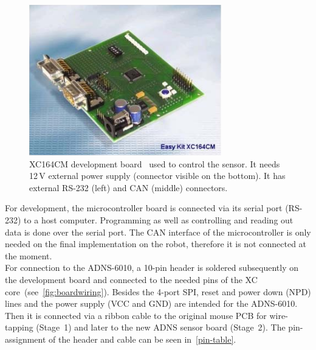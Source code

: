 \documentclass[12pt,a4paper]{article}
\begin{document}
\begin{figure}[htbp]
\begin{center}
\includegraphics[width=0.5\columnwidth]{figures/xcdevboard.png}
\caption{\label{fig:xcdevboard}
XC164CM development board~\cite{xc} used to control the sensor.
It needs 12\,V external power supply (connector visible on the bottom).
It has external RS-232 (left) and CAN (middle) connectors.
}
\end{center}
\end{figure}

For development, the microcontroller board is connected via its serial port (RS-232) to a host computer.
Programming as well as controlling and reading out data is done over the serial port.
The CAN interface of the microcontroller is only needed on the final implementation on the robot, therefore it is not connected at the moment.\\
For connection to the ADNS-6010, a 10-pin header is soldered subsequently on the development board and connected to the needed pins of the XC core~(see~\autoref{fig:boardwiring}).
Besides the 4-port SPI, reset and power down (NPD) lines and the power supply (VCC and GND) are intended for the ADNS-6010.
Then it is connected via a ribbon cable to the original mouse PCB for wire-tapping (Stage~1) and later to the new ADNS sensor board (Stage~2).
The pin-assignment of the header and cable can be seen in~\autoref{pin-table}. 
\end{document}
